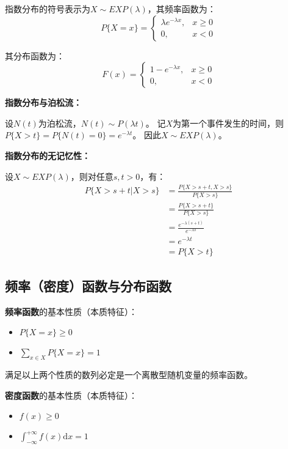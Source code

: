 \documentclass[a4paper,12pt]{ctexart}
\begin{document}
指数分布的符号表示为$X\sim EXP(\lambda)$，其频率函数为：
\begin{equation*}
	P\{X = x\} = \begin{cases}
		\lambda e^{-\lambda x}, & x\geq 0 \\
		0, & x<0
	\end{cases}
\end{equation*}

其分布函数为：
\begin{equation*}
	F(x) = \begin{cases}
		1-e^{-\lambda x}, & x\geq 0 \\
		0, & x<0
	\end{cases}
\end{equation*}

\textbf{指数分布与泊松流：}

设$N(t)$为泊松流，$N(t)\sim P(\lambda t)$。
记$X$为第一个事件发生的时间，则$P\{X > t\} = P\{N(t) = 0\} = e^{-\lambda t}$。
因此$X\sim EXP(\lambda)$。

\textbf{指数分布的无记忆性：}

设$X\sim EXP(\lambda)$，则对任意$s,t>0$，有：
\begin{align*}
	P\{X > s+t|X > s\} &= \frac{P\{X > s+t,X > s\}}{P\{X > s\}} \\
	&= \frac{P\{X > s+t\}}{P\{X > s\}} \\
	&= \frac{e^{-\lambda(s+t)}}{e^{-\lambda s}} \\
	&= e^{-\lambda t} \\
	&= P\{X > t\}
\end{align*}

\subsection{频率（密度）函数与分布函数}

\textbf{频率函数}的基本性质（本质特征）：
\begin{itemize}
	\item $P\{X = x\} \geq 0$
	\item $\sum_{x\in X}P\{X = x\} = 1$
\end{itemize}

满足以上两个性质的数列必定是一个离散型随机变量的频率函数。

\textbf{密度函数}的基本性质（本质特征）：
\begin{itemize}
	\item $f(x) \geq 0$
	\item $\int_{-\infty}^{+\infty}f(x)\mathrm{d}x = 1$
\end{itemize}
\end{document}
